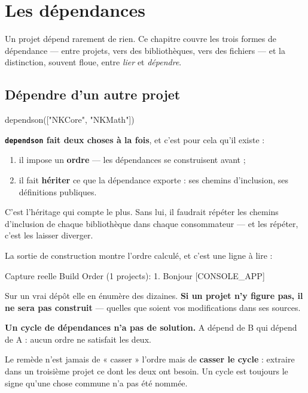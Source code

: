 \chapter{Les dépendances}
\label{ch:dependances}

Un projet dépend rarement de rien. Ce chapitre couvre les trois formes de
dépendance --- entre projets, vers des bibliothèques, vers des fichiers --- et la
distinction, souvent floue, entre \emph{lier} et \emph{dépendre}.

\section{Dépendre d'un autre projet}

\begin{nkcode}{}
dependson(["NKCore", "NKMath"])
\end{nkcode}

\begin{nkretenir}
\textbf{\texttt{dependson} fait deux choses à la fois}, et c'est pour cela qu'il
existe :

\begin{enumerate}
\item il impose un \textbf{ordre} --- les dépendances se construisent avant ;
\item il fait \textbf{hériter} ce que la dépendance exporte : ses chemins
      d'inclusion, ses définitions publiques.
\end{enumerate}

C'est l'héritage qui compte le plus. Sans lui, il faudrait répéter les chemins
d'inclusion de chaque bibliothèque dans chaque consommateur --- et les répéter,
c'est les laisser diverger.
\end{nkretenir}

\begin{nkretenir}
La sortie de construction montre l'ordre calculé, et c'est une ligne à lire :

\begin{nkcode}{Capture reelle}
Build Order (1 projects):
  1. Bonjour [CONSOLE_APP]
\end{nkcode}

Sur un vrai dépôt elle en énumère des dizaines. \textbf{Si un projet n'y figure
pas, il ne sera pas construit} --- quelles que soient vos modifications dans ses
sources.
\end{nkretenir}

\begin{nkpiege}
\textbf{Un cycle de dépendances n'a pas de solution.} A dépend de B qui dépend de
A : aucun ordre ne satisfait les deux.

Le remède n'est jamais de « casser » l'ordre mais de \textbf{casser le cycle} :
extraire dans un troisième projet ce dont les deux ont besoin. Un cycle est
toujours le signe qu'une chose commune n'a pas été nommée.
\end{nkpiege}

